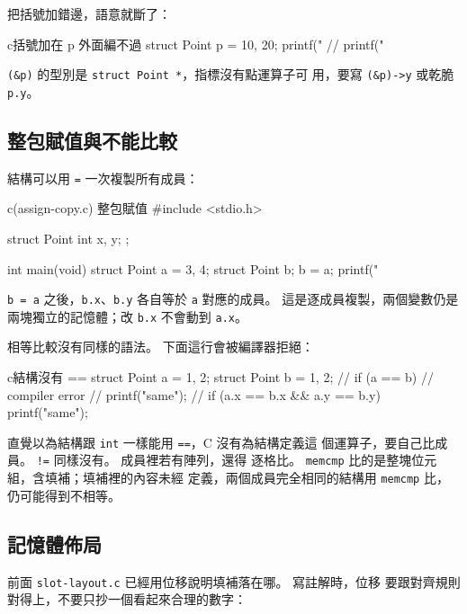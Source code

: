 把括號加錯邊，語意就斷了：

\begin{code}{c}{括號加在 p 外面編不過}
struct Point p = {10, 20};
printf("%
// printf("%
\end{code}

\texttt{(\&p)} 的型別是 \texttt{struct Point *}，指標沒有點運算子可
用，要寫 \texttt{(\&p)->y} 或乾脆 \texttt{p.y}。

\subsection{整包賦值與不能比較}

結構可以用 \texttt{=} 一次複製所有成員：

\begin{example}{c}{(assign-copy.c) 整包賦值}
#include <stdio.h>

struct Point {
    int x, y;
};

int main(void) {
    struct Point a = {3, 4};
    struct Point b;
    b = a;
    printf("%
}
\end{example}


\texttt{b = a} 之後，\texttt{b.x}、\texttt{b.y} 各自等於 \texttt{a}
對應的成員。 這是逐成員複製，兩個變數仍是兩塊獨立的記憶體；改
\texttt{b.x} 不會動到 \texttt{a.x}。

相等比較沒有同樣的語法。 下面這行會被編譯器拒絕：

\begin{code}{c}{結構沒有 ==}
struct Point a = {1, 2};
struct Point b = {1, 2};
// if (a == b) {        // compiler error
//     printf("same\n");
// }
if (a.x == b.x && a.y == b.y) {
    printf("same\n");
}
\end{code}

直覺以為結構跟 \texttt{int} 一樣能用 \texttt{==}，C 沒有為結構定義這
個運算子，要自己比成員。 \texttt{!=} 同樣沒有。 成員裡若有陣列，還得
逐格比。 \texttt{memcmp} 比的是整塊位元組，含填補；填補裡的內容未經
定義，兩個成員完全相同的結構用 \texttt{memcmp} 比，仍可能得到不相等。

\subsection{記憶體佈局}

前面 \texttt{slot-layout.c} 已經用位移說明填補落在哪。 寫註解時，位移
要跟對齊規則對得上，不要只抄一個看起來合理的數字：

